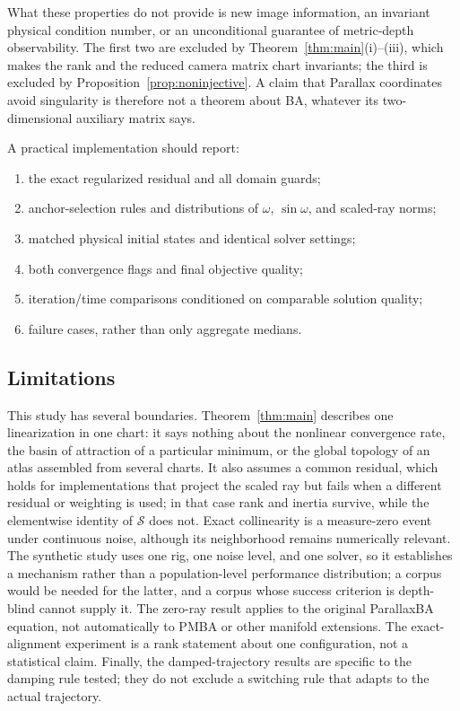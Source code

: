 \documentclass[11pt,a4paper]{article}
\theoremstyle{definition}
\theoremstyle{remark}
\begin{document}
What these properties do not provide is new image information, an invariant physical condition number, or an unconditional guarantee of metric-depth observability. The first two are excluded by Theorem~\ref{thm:main}(i)--(iii), which makes the rank and the reduced camera matrix chart invariants; the third is excluded by Proposition~\ref{prop:noninjective}. A claim that Parallax coordinates avoid singularity is therefore not a theorem about BA, whatever its two-dimensional auxiliary matrix says.

A practical implementation should report:
\begin{enumerate}[leftmargin=2em]
  \item the exact regularized residual and all domain guards;
  \item anchor-selection rules and distributions of $\omega$, $\sin\omega$, and scaled-ray norms;
  \item matched physical initial states and identical solver settings;
  \item both convergence flags and final objective quality;
  \item iteration/time comparisons conditioned on comparable solution quality;
  \item failure cases, rather than only aggregate medians.
\end{enumerate}

\subsection{Limitations}
This study has several boundaries. Theorem~\ref{thm:main} describes one linearization in one chart: it says nothing about the nonlinear convergence rate, the basin of attraction of a particular minimum, or the global topology of an atlas assembled from several charts. It also assumes a common residual, which holds for implementations that project the scaled ray but fails when a different residual or weighting is used; in that case rank and inertia survive, while the elementwise identity of $\mathcal S$ does not. Exact collinearity is a measure-zero event under continuous noise, although its neighborhood remains numerically relevant. The synthetic study uses one rig, one noise level, and one solver, so it establishes a mechanism rather than a population-level performance distribution; a corpus would be needed for the latter, and a corpus whose success criterion is depth-blind cannot supply it. The zero-ray result applies to the original ParallaxBA equation, not automatically to PMBA or other manifold extensions. The exact-alignment experiment is a rank statement about one configuration, not a statistical claim. Finally, the damped-trajectory results are specific to the damping rule tested; they do not exclude a switching rule that adapts to the actual trajectory.
\end{document}
